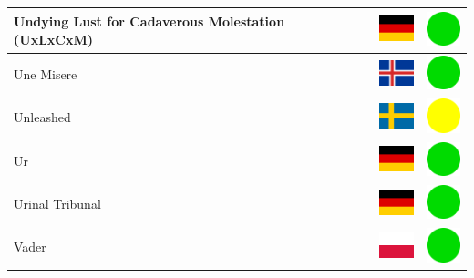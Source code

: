 \documentclass[12pt, a4paper, twoside]{report}
\begin{document}
\begin{center}
\begin{longtable}{|p{5cm}|p{2cm}|p{2cm}|}
Undying Lust for Cadaverous Molestation (UxLxCxM) & \includegraphics[width=1cm]{4x3/de} & \includegraphics[width=1cm]{likes/y} \\ \hline
Une Misere & \includegraphics[width=1cm]{4x3/is} & \includegraphics[width=1cm]{likes/y} \\ \hline
Unleashed & \includegraphics[width=1cm]{4x3/se} & \includegraphics[width=1cm]{likes/m} \\ \hline
Ur & \includegraphics[width=1cm]{4x3/de} & \includegraphics[width=1cm]{likes/y} \\ \hline
Urinal Tribunal & \includegraphics[width=1cm]{4x3/de} & \includegraphics[width=1cm]{likes/y} \\ \hline
Vader & \includegraphics[width=1cm]{4x3/pl} & \includegraphics[width=1cm]{likes/y} \\ \hline

\end{longtable}
\end{center}
\end{document}
